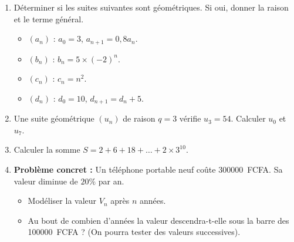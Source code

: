 \documentclass[11pt]{article}
\begin{document}
\begin{exercice}
\begin{enumerate}
    \item Déterminer si les suites suivantes sont géométriques. Si oui, donner la raison et le terme général.
    \begin{itemize}
        \item $(a_n)$ : $a_0 = 3$, $a_{n+1} = 0,8 a_n$.
        \item $(b_n)$ : $b_n = 5 \times (-2)^n$.
        \item $(c_n)$ : $c_n = n^2$.
        \item $(d_n)$ : $d_0 = 10$, $d_{n+1} = d_n + 5$.
    \end{itemize}
    \item Une suite géométrique $(u_n)$ de raison $q=3$ vérifie $u_3 = 54$. Calculer $u_0$ et $u_7$.
    \item Calculer la somme $S = 2 + 6 + 18 + \dots + 2 \times 3^{10}$.
    \item \textbf{Problème concret :} Un téléphone portable neuf coûte \SI{300000}{FCFA}. Sa valeur diminue de $20\%$ par an.
    \begin{itemize}
        \item Modéliser la valeur $V_n$ après $n$ années.
        \item Au bout de combien d'années la valeur descendra-t-elle sous la barre des \SI{100000}{FCFA} ? (On pourra tester des valeurs successives).
    \end{itemize}
\end{enumerate}
\end{exercice}
\end{document}
